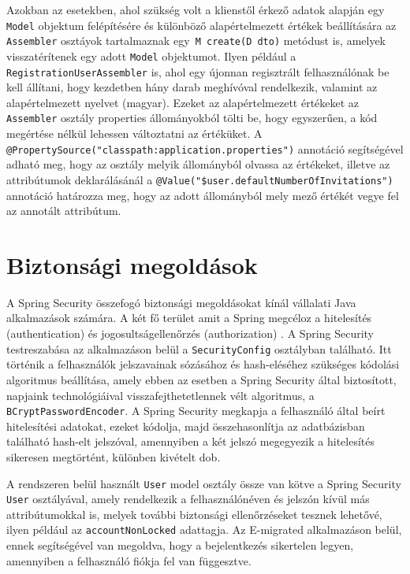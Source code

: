 Azokban az esetekben, ahol szükség volt a klienstől érkező adatok alapján egy \texttt{Model} objektum felépítésére és különböző alapértelmezett értékek beállítására az \texttt{Assembler} osztáyok tartalmaznak egy\texttt{ M create(D dto)} metódust is, amelyek visszatérítenek egy adott \texttt{Model} objektumot. Ilyen például a \texttt{RegistrationUserAssembler} is, ahol egy újonnan regisztrált felhasználónak be kell állítani, hogy kezdetben hány darab meghívóval rendelkezik, valamint az alapértelmezett nyelvet (magyar). Ezeket az alapértelmezett értékeket az \texttt{Assembler} osztály properties állományokból tölti be, hogy egyszerűen, a kód megértése nélkül lehessen változtatni az értéküket. A \texttt{@PropertySource("classpath:application.properties")} annotáció segítségével adható meg, hogy az osztály melyik állományból olvassa az értékeket, illetve az attribútumok deklarálásánál a \texttt{@Value("\${user.defaultNumberOfInvitations}")} annotáció határozza meg, hogy az adott állományból mely mező értékét vegye fel az annotált attribútum.

\section{Biztonsági megoldások}
\label{subsec:biztonsag}
A Spring Security összefogó biztonsági megoldásokat kínál vállalati Java alkalmazások számára. A két fő terület amit a Spring megcéloz a hitelesítés (authentication) és jogosultságellenőrzés (authorization) \cite{SpringSec}. 
A Spring Security testreszabása az alkalmazáson belül a  \texttt{SecurityConfig} osztályban található. Itt történik a felhasználók jelszavainak sózásához és hash-eléséhez szükséges kódolási algoritmus beállítása, amely ebben az esetben a Spring Security által biztosított, napjaink technológiáival visszafejthetetlennek vélt algoritmus, a \texttt{BCryptPasswordEncoder}. A Spring Security megkapja a felhasználó által beírt hitelesítési adatokat, ezeket kódolja, majd összehasonlítja az adatbázisban található hash-elt jelszóval, amennyiben a két jelszó megegyezik a hitelesítés sikeresen megtörtént, különben kivételt dob. 

A rendszeren belül használt \texttt{User} model osztály össze van kötve a Spring Security \texttt{User} osztályával, amely rendelkezik a felhasználónéven és jelszón kívül más attribútumokkal is, melyek további biztonsági ellenőrzéseket tesznek lehetővé, ilyen például az \texttt{accountNonLocked} adattagja. Az E-migrated alkalmazáson belül, ennek segítségével van megoldva, hogy a bejelentkezés sikertelen legyen, amennyiben a felhasználó fiókja fel van függesztve.


